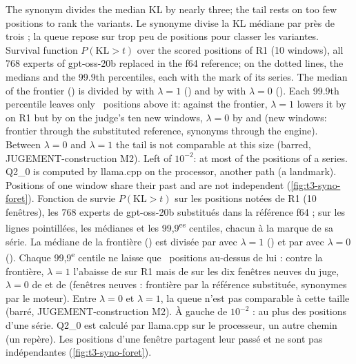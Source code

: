   {The synonym divides the median KL by nearly three; the tail rests on too few positions to rank the variants.}
  {Le synonyme divise la KL médiane par près de trois ; la queue repose sur trop peu de positions pour classer les
   variantes.}
  {Survival function $P(\mathrm{KL}>t)$ over the \CodonNum{\SynoNPositions} scored positions of R1 (10 windows), all
   768 experts of gpt-oss-20b replaced in the f64 reference; on the dotted lines, the medians and the 99.9th
   percentiles, each with the mark of its series. The median of the frontier (\CodonNum{\SynoNMedF}) is divided by
   \CodonNum{\SynoNDivUn} with $\lambda=1$ (\CodonNum{\SynoNMedUn}) and by \CodonNum{\SynoNDivZero} with $\lambda=0$
   (\CodonNum{\SynoNMedZero}). Each 99.9th percentile leaves only \SynoNQueueDessus\ positions above it: against
   the frontier, $\lambda=1$ lowers it by \Pourcent{\SynoNQueueUnRun} on R1 but by \Pourcent{\SynoNQueueUnNeuf} on
   the judge's ten new windows, $\lambda=0$ by \Pourcent{\SynoNQueueZeroRun} and \Pourcent{\SynoNQueueZeroNeuf} (new
   windows: frontier through the substituted reference, synonyms through the engine). Between $\lambda=0$ and
   $\lambda=1$ the tail is not comparable at this size (barred, JUGEMENT-construction M2). Left of $10^{-2}$: at most
   \Pourcent{\SynoNSurvieGauche} of the positions of a series. Q2\_0 is computed by llama.cpp on the processor,
   another path (a landmark). Positions of one window share their past and are not independent
   (\cref{fig:t3-syno-foret}).}
  {Fonction de survie $P(\mathrm{KL}>t)$ sur les \CodonNum{\SynoNPositions} positions notées de R1 (10 fenêtres), les
   768 experts de gpt-oss-20b substitués dans la référence f64 ; sur les lignes pointillées, les médianes et les
   99,9\textsuperscript{es} centiles, chacun à la marque de sa série. La médiane de la frontière
   (\CodonNum{\SynoNMedF}) est divisée par \CodonNum{\SynoNDivUn} avec $\lambda=1$ (\CodonNum{\SynoNMedUn}) et par
   \CodonNum{\SynoNDivZero} avec $\lambda=0$ (\CodonNum{\SynoNMedZero}). Chaque 99,9\textsuperscript{e} centile ne
   laisse que \SynoNQueueDessus\ positions au-dessus de lui : contre la frontière, $\lambda=1$ l'abaisse de
   \Pourcent{\SynoNQueueUnRun} sur R1 mais de \Pourcent{\SynoNQueueUnNeuf} sur les dix fenêtres neuves du juge,
   $\lambda=0$ de \Pourcent{\SynoNQueueZeroRun} et de \Pourcent{\SynoNQueueZeroNeuf} (fenêtres neuves : frontière par
   la référence substituée, synonymes par le moteur). Entre $\lambda=0$ et $\lambda=1$, la queue n'est pas
   comparable à cette taille (barré, JUGEMENT-construction M2). À gauche de $10^{-2}$ : au plus
   \Pourcent{\SynoNSurvieGauche} des positions d'une série. Q2\_0 est calculé par llama.cpp sur le processeur, un
   autre chemin (un repère). Les positions d'une fenêtre partagent leur passé et ne sont pas indépendantes
   (\cref{fig:t3-syno-foret}).}

